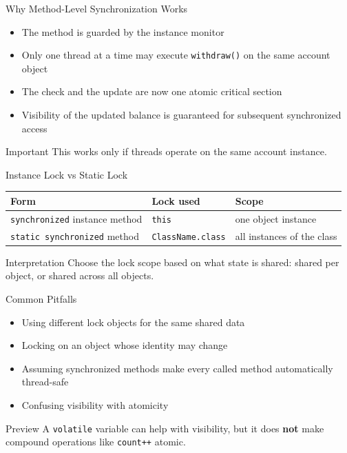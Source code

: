 \documentclass[aspectratio=169,11pt]{beamer}
\begin{document}
	\begin{frame}{Why Method-Level Synchronization Works}
		\begin{itemize}
			\item The method is guarded by the instance monitor
			\item Only one thread at a time may execute \texttt{withdraw()} on the same account object
			\item The check and the update are now one atomic critical section
			\item Visibility of the updated balance is guaranteed for subsequent synchronized access
		\end{itemize}
		
		\bigskip
		
		\begin{alertblock}{Important}
			This works only if threads operate on the same account instance.
		\end{alertblock}
	\end{frame}
	
	\begin{frame}{Instance Lock vs Static Lock}
		\centering
		\begin{tabular}{@{}lll@{}}
			\toprule
			\textbf{Form} & \textbf{Lock used} & \textbf{Scope} \\
			\midrule
			\texttt{synchronized} instance method & \texttt{this} & one object instance \\
			\texttt{static synchronized} method & \texttt{ClassName.class} & all instances of the class \\
			\bottomrule
		\end{tabular}
		
		\bigskip
		
		\begin{block}{Interpretation}
			Choose the lock scope based on what state is shared:
			shared per object, or shared across all objects.
		\end{block}
	\end{frame}
	
	\begin{frame}{Common Pitfalls}
		\begin{itemize}
			\item Using different lock objects for the same shared data
			\item Locking on an object whose identity may change
			\item Assuming synchronized methods make every called method automatically thread-safe
			\item Confusing visibility with atomicity
		\end{itemize}
		
		\bigskip
		
		\begin{alertblock}{Preview}
			A \texttt{volatile} variable can help with visibility, but it does \textbf{not} make compound operations like \texttt{count++} atomic.
		\end{alertblock}
	\end{frame}
	
\end{document}
